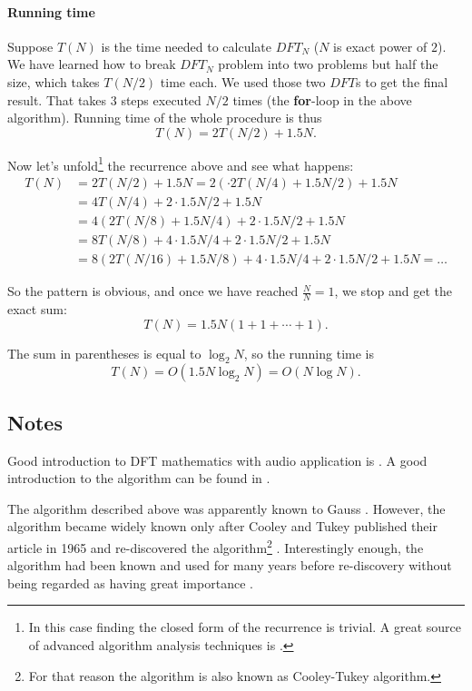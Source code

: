 \documentclass[10pt]{article}
\begin{document}
\paragraph{Running time} Suppose $T(N)$ is the time needed to calculate $DFT_N$
($N$ is exact power of $2$). We have learned how to break $DFT_N$ problem into
two problems but half the size, which takes $T(N/2)$ time each. We used those
two $DFT$s to get the final result. That takes $3$ steps executed $N/2$ times
(the {\bf for}-loop in the above algorithm). Running time of the whole
procedure is thus $$T(N)=2T(N/2) + 1.5N.$$

Now let's unfold\footnote{In this case finding the closed form of the recurrence
is trivial. A great source of advanced algorithm analysis techniques is
\cite{Sedgewick2001}.} the recurrence above and see what happens:
\begin{align*}
T(N) &= 2T(N/2) + 1.5N = 2(\cdot 2T(N/4) + 1.5N/2) + 1.5N\\
    &= 4T(N/4) + 2 \cdot 1.5N/2 + 1.5N \\
    &= 4(2T(N/8) + 1.5N/4) + 2 \cdot 1.5N/2 + 1.5N\\
    &= 8T(N/8) + 4 \cdot 1.5N/4 + 2\cdot 1.5N/2 + 1.5N\\
    &= 8(2T(N/16) + 1.5N/8) + 4 \cdot 1.5N/4 + 2\cdot 1.5N/2 + 1.5N = \ldots
\end{align*}

So the pattern is obvious, and once we have reached $\frac{N}{N}=1$, we stop
and get the exact sum: $$T(N) = 1.5N(1 + 1 + \cdots + 1).$$

The sum in parentheses is equal to $\log_2 N$, so the running time is
$$T(N) = O(1.5N \log_2 N) = O(N\log N).$$

\centerline{}

\subsection*{Notes}

Good introduction to DFT mathematics with audio application is \cite{Smith}. A
good introduction to the algorithm can be found in \cite{Papadim2006}.

The algorithm described above was apparently known to Gauss
\cite{Heideman1985}. However, the algorithm became widely known only after
Cooley and Tukey published their article in 1965 and re-discovered the
algorithm\footnote{For that reason the algorithm is also known as Cooley-Tukey
algorithm.} \cite{Cooley1965}. Interestingly enough, the algorithm had been
known and used for many years before re-discovery without being regarded as
having great importance \cite{Cooley1987}.
\end{document}
